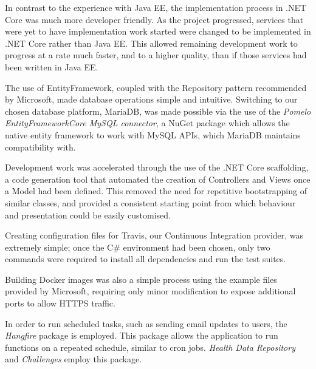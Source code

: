 In contrast to the experience with Java EE, the implementation process in .NET Core was much more developer friendly. As the project progressed, services that were yet to have implementation work started were changed to be implemented in .NET Core rather than Java EE. This allowed remaining development work to progress at a rate much faster, and to a higher quality, than if those services had been written in Java EE.

The use of EntityFramework, coupled with the Repository pattern\cite{dotnet_repository_pattern} recommended by Microsoft, made database operations simple and intuitive. Switching to our chosen database platform, MariaDB, was made possible via the use of the \textit{Pomelo EntityFrameworkCore MySQL connector}\cite{Pomelo}, a NuGet package which allows the native entity framework to work with MySQL APIs, which MariaDB maintains compatibility with.

Development work was accelerated through the use of the .NET Core scaffolding, a code generation tool that automated the creation of Controllers and Views once a Model had been defined. This removed the need for repetitive bootstrapping of similar classes, and provided a consistent starting point from which behaviour and presentation could be easily customised.

Creating configuration files for Travis, our Continuous Integration provider, was extremely simple; once the C\# environment had been chosen, only two commands were required to install all dependencies and run the test suites.

Building Docker images was also a simple process using the example files provided by Microsoft\cite{dotnet_docker}, requiring only minor modification to expose additional ports to allow HTTPS traffic.

In order to run scheduled tasks, such as sending email updates to users, the \textit{Hangfire}\cite{hangfire} package is employed. This package allows the application to run functions on a repeated schedule, similar to cron jobs. \textit{Health Data Repository} and \textit{Challenges} employ this package.